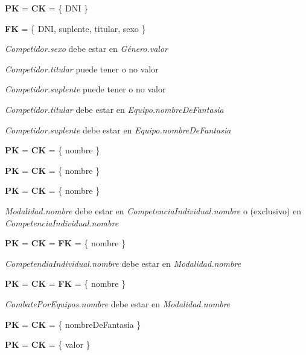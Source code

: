 \textbf{PK} = \textbf{CK} = \{ DNI \}

\textbf{FK} = \{ DNI, suplente, titular, sexo \}

\textit{Competidor.sexo} debe estar en \textit{Género.valor}

\textit{Competidor.titular} puede tener o no valor

\textit{Competidor.suplente} puede tener o no valor

\textit{Competidor.titular} debe estar en \textit{Equipo.nombreDeFantasia}

\textit{Competidor.suplente} debe estar en \textit{Equipo.nombreDeFantasia}\\


\textbf{PK} = \textbf{CK} = \{ nombre \}\\


\textbf{PK} = \textbf{CK} = \{ nombre \}\\


\textbf{PK} = \textbf{CK} = \{ nombre \}

\textit{Modalidad.nombre} debe estar en \textit{CompetenciaIndividual.nombre} o (exclusivo) en \textit{CompetenciaIndividual.nombre}\\


\textbf{PK} = \textbf{CK} = \textbf{FK} = \{ nombre \}

\textit{CompetendiaIndividual.nombre} debe estar en \textit{Modalidad.nombre}\\


\textbf{PK} = \textbf{CK} = \textbf{FK} = \{ nombre \}

\textit{CombatePorEquipos.nombre} debe estar en \textit{Modalidad.nombre}\\


\textbf{PK} = \textbf{CK} = \{ nombreDeFantasia \}\\


\textbf{PK} = \textbf{CK} = \{ valor \}

